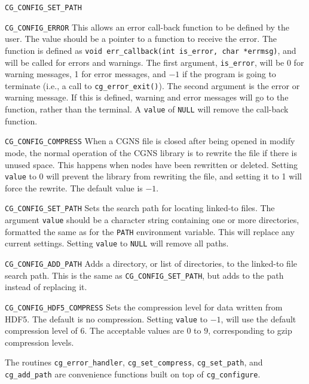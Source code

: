 \begin{Ventryi}{\texttt{CG\_CONFIG\_SET\_PATH}}
\item [\texttt{CG\_CONFIG\_ERROR}]
      This allows an error call-back function to be defined by the
      user.
      The value should be a pointer to a function to receive the error.
      The function is defined as \texttt{void err\_callback(int is\_error,
      char *errmsg)}, and will be called for errors and warnings.
      The first argument, \texttt{is\_error}, will be 0 for warning
      messages, 1 for error messages, and $-1$ if the program is
      going to terminate (i.e., a call to \texttt{cg\_error\_exit()}).
      The second argument is the error or warning message.
      If this is defined, warning and error messages will go to the
      function, rather than the terminal.
      A \texttt{value} of \texttt{NULL} will remove the call-back
      function.
\item [\texttt{CG\_CONFIG\_COMPRESS}]
      When a CGNS file is closed after being opened in modify mode, the
      normal operation of the CGNS library is to rewrite the file if
      there is unused space.
      This happens when nodes have been rewritten or deleted.
      Setting \texttt{value} to 0 will prevent the library from
      rewriting the file, and setting it to 1 will force the rewrite.
      The default value is $-1$.
\item [\texttt{CG\_CONFIG\_SET\_PATH}]
      Sets the search path for locating linked-to files.
      The argument \texttt{value} should be a character string
      containing one or more directories, formatted the same as for the
      \texttt{PATH} environment variable.
      This will replace any current settings.
      Setting \texttt{value} to \texttt{NULL} will remove all paths.
\item [\texttt{CG\_CONFIG\_ADD\_PATH}]
      Adds a directory, or list of directories, to the linked-to file
      search path.
      This is the same as \texttt{CG\_CONFIG\_SET\_PATH}, but adds to
      the path instead of replacing it.
\item [\texttt{CG\_CONFIG\_HDF5\_COMPRESS}]
      Sets the compression level for data written from HDF5. The default 
      is no compression. Setting \texttt{value} to $-1$, will use the default 
      compression level of $6$. The acceptable values are $0$ to $9$, 
      corresponding to gzip compression levels.
\end{Ventryi}

The routines \texttt{cg\_error\_handler}, \texttt{cg\_set\_compress}, 
\texttt{cg\_set\_path}, and \texttt{cg\_add\_path} are convenience functions 
built on top of \texttt{cg\_configure}.

